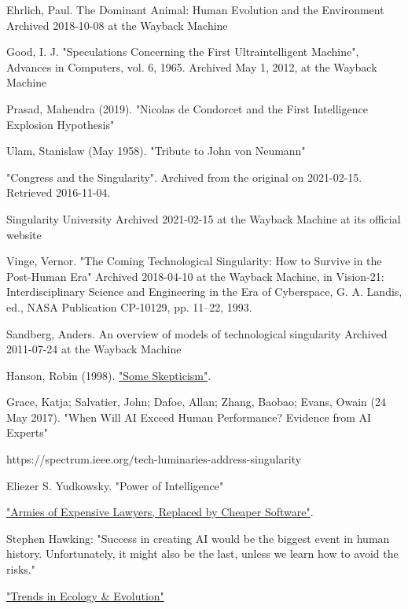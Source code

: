 \documentclass[a4paper]{article}
\begin{document}
\begin{thebibliography}{9}

 Ehrlich, Paul. The Dominant Animal: Human Evolution and the Environment Archived 2018-10-08 at the Wayback Machine

 Good, I. J. "Speculations Concerning the First Ultraintelligent Machine", Advances in Computers, vol. 6, 1965. Archived May 1, 2012, at the Wayback Machine

Prasad, Mahendra (2019). "Nicolas de Condorcet and the First Intelligence Explosion Hypothesis"

 Ulam, Stanislaw (May 1958). "Tribute to John von Neumann"

  "Congress and the Singularity". Archived from the original on 2021-02-15. Retrieved 2016-11-04.

 Singularity University Archived 2021-02-15 at the Wayback Machine at its official website
 
 Vinge, Vernor. "The Coming Technological Singularity: How to Survive in the Post-Human Era" Archived 2018-04-10 at the Wayback Machine, in Vision-21: Interdisciplinary Science and Engineering in the Era of Cyberspace, G. A. Landis, ed., NASA Publication CP-10129, pp. 11–22, 1993.


 Sandberg, Anders. An overview of models of technological singularity Archived 2011-07-24 at the Wayback Machine

 Hanson, Robin (1998). \href{https://mason.gmu.edu/~rhanson/vc.html#hanson}{"Some Skepticism"}.

 Grace, Katja; Salvatier, John; Dafoe, Allan; Zhang, Baobao; Evans, Owain (24 May 2017). "When Will AI Exceed Human Performance? Evidence from AI Experts"

 https://spectrum.ieee.org/tech-luminaries-address-singularity

 Eliezer S. Yudkowsky. "Power of Intelligence"

\href{https://www.nytimes.com/2011/03/05/science/05legal.html}{"Armies of Expensive Lawyers, Replaced by Cheaper Software"}.

Stephen Hawking: "Success in creating AI would be the biggest event in human history. Unfortunately, it might also be the last, unless we learn how to avoid the risks."

\href{https://www.sciencedirect.com/science/article/abs/pii/S0169534703003458}{"Trends in Ecology \& Evolution"}



\end{thebibliography}
\end{document}
